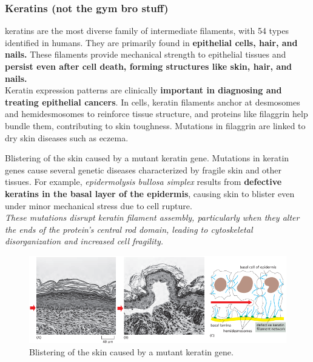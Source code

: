\documentclass[../main.tex]{subfiles}
\begin{document}
\subsubsection{Keratins (not the gym bro stuff)}

\gls{keratins} are the most diverse family of intermediate filaments, with 54 types identified in humans. They are primarily found in \textbf{epithelial cells, hair, and nails.} These filaments provide mechanical strength to epithelial tissues and \textbf{persist even after cell death, forming structures like skin, hair, and nails.}\\
\indent Keratin expression patterns are clinically \textbf{important in diagnosing and treating epithelial cancers}. In cells, keratin filaments anchor at desmosomes and hemidesmosomes to reinforce tissue structure, and proteins like filaggrin help bundle them, contributing to skin toughness. Mutations in filaggrin are linked to dry skin diseases such as eczema.

\begin{RemarkWithTitel}{Blistering of the skin caused by a mutant keratin gene.}
	Mutations in keratin genes cause several genetic diseases characterized by fragile skin and other tissues. For example, \textit{epidermolysis bullosa simplex} results from \textbf{defective keratins in the basal layer of the epidermis}, causing skin to blister even under minor mechanical stress due to cell rupture. \\
	\indent \textit{These mutations disrupt keratin filament assembly, particularly when they alter the ends of the protein’s central rod domain, leading to cytoskeletal disorganization and increased cell fragility.}

	\begin{figure}[H]
		\centering
		\includegraphics[width = 0.9 \textwidth]{41}
		\caption{Blistering of the skin caused by a mutant keratin gene.}
	\end{figure}
\end{RemarkWithTitel}

	
\end{document}
